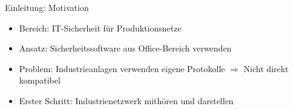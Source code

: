 \begin{frame}{Einleitung: Motivation}
    \begin{itemize}[<+->]
      \item Bereich: IT-Sicherheit für Produktionsnetze
      \item Ansatz: Sicherheitssoftware aus Office-Bereich verwenden
      \item Problem: Industrieanlagen verwenden eigene Protokolle
            \newline $\Rightarrow$ Nicht direkt kompatibel
      \item Erster Schritt: Industrienetzwerk mithören und darstellen
    \end{itemize}
\end{frame} 